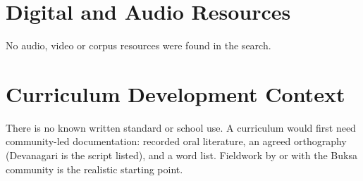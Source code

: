 \documentclass[12pt]{article}
\begin{document}
\section{Digital and Audio Resources}
No audio, video or corpus resources were found in the search.

\section{Curriculum Development Context}
There is no known written standard or school use. A curriculum would first need community-led documentation: recorded oral literature, an agreed orthography (Devanagari is the script listed), and a word list. Fieldwork by or with the Buksa community is the realistic starting point.
\end{document}
